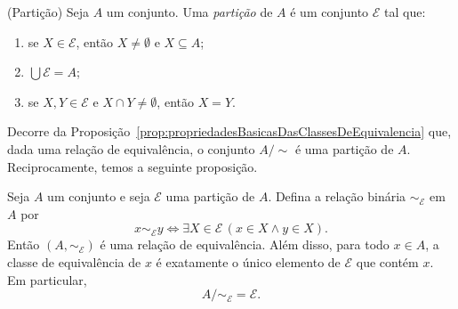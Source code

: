 \begin{definition}[$\BST$](Partição)\label{def:particao}
    Seja $A$ um conjunto.
    Uma \emph{partição} de $A$ é um conjunto $\mathcal{E}$ tal que:
    \begin{enumerate}[label=(\roman*)]
        \item se $X \in \mathcal{E}$, então $X \neq \emptyset$ e $X \subseteq A$;
        \item $\bigcup \mathcal{E}=A$;
        \item se $X, Y \in \mathcal{E}$ e $X \cap Y \neq \emptyset$, então $X=Y$.
    \end{enumerate}
\end{definition}

Decorre da Proposição~\ref{prop:propriedadesBasicasDasClassesDeEquivalencia} que, dada uma relação de equivalência, o conjunto $A/{\sim}$ é uma partição de $A$.
Reciprocamente, temos a seguinte proposição.

\begin{proposition}[$\ZmI$]\label{prop:particaoInduzRelacaoDeEquivalencia}
    Seja $A$ um conjunto e seja $\mathcal{E}$ uma partição de $A$.
    Defina a relação binária $\sim_{\mathcal{E}}$ em $A$ por
    \[
    x \sim_{\mathcal{E}} y \iff \exists X \in \mathcal{E}\, (x \in X \wedge y \in X).
    \]
    Então $(A, \sim_{\mathcal{E}})$ é uma relação de equivalência.
    Além disso, para todo $x \in A$, a classe de equivalência de $x$ é exatamente o único elemento de $\mathcal{E}$ que contém $x$.
    Em particular,
    \[
    A/{\sim_{\mathcal{E}}} = \mathcal{E}.
    \]
\end{proposition}

